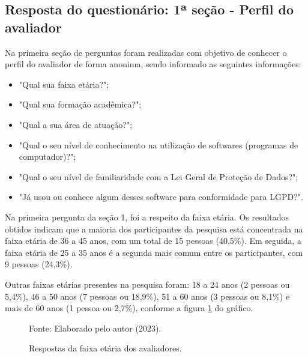 \documentclass[
	12pt,				%
	openright,			%
	oneside,			%
	a4paper,			%
	english,			%
	french,				%
	spanish,			%
	brazil,				%
	]{abntex2}
\begin{document}
 \subsection{Resposta do questionário: 1ª seção - Perfil do avaliador}
 Na primeira seção  de perguntas foram realizadas com objetivo de conhecer o perfil do avaliador de forma anonima, sendo informado as seguintes informações:
 \begin{itemize}
 
 \item "Qual sua faixa etária?";
 \item "Qual sua formação acadêmica?";
 \item "Qual a sua área de atuação?";
 \item "Qual o seu nível de conhecimento na utilização de softwares (programas de computador)?";
 \item "Qual o seu nível de familiaridade com a Lei Geral de Proteção de Dados?";
 \item "Já usou ou conhece algum desses software para conformidade para LGPD?".

 \end{itemize}

 Na primeira pergunta da seção 1, foi a respeito da faixa etária. Os resultados obtidos indicam que a maioria dos participantes da pesquisa está concentrada na faixa etária de 36 a 45 anos, com um total de 15 pessoas (40,5\%). Em seguida, a faixa etária de 25 a 35 anos é a segunda mais comum entre os participantes, com 9 pessoas (24,3\%).

Outras faixas etárias presentes na pesquisa foram: 18 a 24 anos (2 pessoas ou 5,4\%), 46 a 50 anos (7 pessoas ou 18,9\%), 51 a 60 anos (3 pessoas ou 8,1\%) e mais de 60 anos (1 pessoa ou 2,7\%), conforme a figura \ref{fig: grafico1} do gráfico.

\label{sec: resultados}

\begin{figure}[ht]
    \centering
    \caption{Respostas da faixa etária dos avaliadores.}
    \label{fig: grafico1}
    
    \centering \small Fonte: Elaborado pelo autor (2023).
\end{figure}
\end{document}
